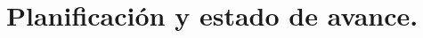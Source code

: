 \chapter{Planificación y estado de avance.}

\ifpdf
    \graphicspath{{Chapter5/Figs/Raster/}{Chapter5/Figs/PDF/}{Chapter5/Figs/}}
\else
    \graphicspath{{Chapter5/Figs/Vector/}{Chapter5/Figs/}}
\fi
